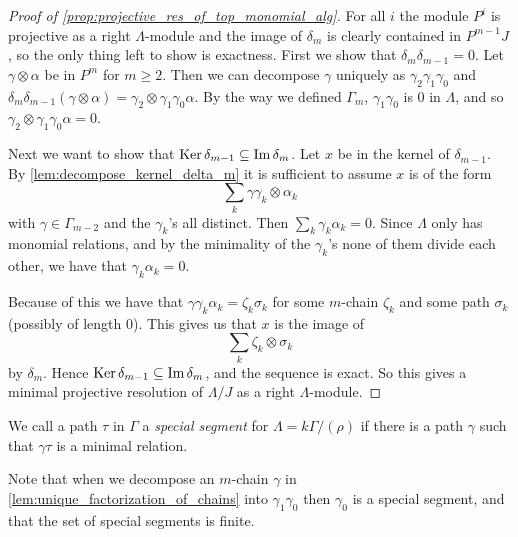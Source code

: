 \begin{proof}[Proof of \cref{prop:projective_res_of_top_monomial_alg}]
	For all $i$ the module $P^i$ is projective as a right $\Lambda$-module and the image of $\delta_m$ is clearly contained in $P^{m-1}J$, so the only thing left to show is exactness. First we show that $\delta_m\delta_{m-1}=0$. Let $\gamma\otimes \alpha$ be in $P^m$ for $m \geq 2$. Then we can decompose $\gamma$ uniquely as $\gamma_2\gamma_1\gamma_0$ and $\delta_m\delta_{m-1}(\gamma\otimes \alpha) = \gamma_2\otimes\gamma_1\gamma_0\alpha$. By the way we defined $\Gamma_m$, $\gamma_1\gamma_0$ is 0 in $\Lambda$, and so $\gamma_2\otimes\gamma_1\gamma_0\alpha = 0$.
	
	Next we want to show that $\operatorname{Ker}\delta_{m-1} \subseteq \operatorname{Im}\delta_m$. Let $x$ be in the kernel of $\delta_{m-1}$. By \cref{lem:decompose_kernel_delta_m} it is sufficient to assume $x$ is of the form
	$$\sum_k \gamma  \gamma_k \otimes \alpha_k$$
	with $\gamma \in \Gamma_{m-2}$ and the $\gamma_k$'s all distinct. Then $\sum_k \gamma_k\alpha_k = 0$. Since $\Lambda$ only has monomial relations, and by the minimality of the $\gamma_k$'s none of them divide each other, we have that $\gamma_{k}\alpha_{k}=0$.
	
	Because of this we have that $\gamma\gamma_k\alpha_k=\zeta_k\sigma_k$ for some $m$-chain $\zeta_k$ and some path $\sigma_k$ (possibly of length 0). This gives us that $x$ is the image of 
	$$\sum_k \zeta_k\otimes \sigma_k$$ 
	by $\delta_m$. Hence $\operatorname{Ker}\delta_{m-1} \subseteq \operatorname{Im}\delta_m$, and the sequence is exact. So this gives a minimal projective resolution of $\Lambda/J$ as a right $\Lambda$-module.
\end{proof}

\begin{defn}
	We call a path $\tau$ in $\Gamma$ a \emph{special segment} for $\Lambda = k\Gamma/(\rho)$ if there is a path $\gamma$ such that $\gamma\tau$ is a minimal relation.
\end{defn}

Note that when we decompose an $m$-chain $\gamma$ in \cref{lem:unique_factorization_of_chains} into $\gamma_1\gamma_0$ then $\gamma_0$ is a special segment, and that the set of special segments is finite.

